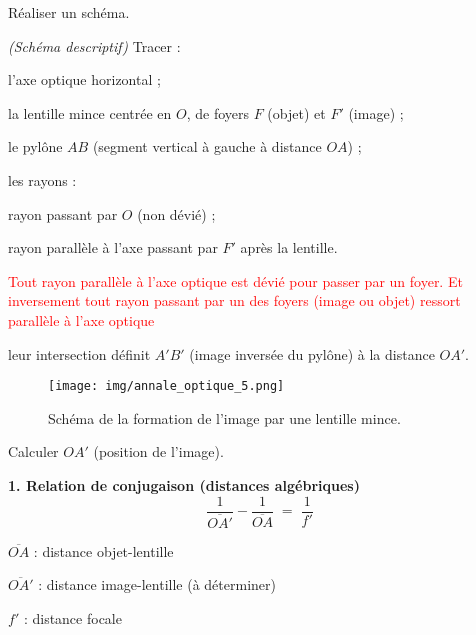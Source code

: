 \documentclass[answers]{exam}
\begin{document}
\begin{questions}
\begin{questions}

\question[C.6.1] Réaliser un schéma.

  \begin{solution}
  \textit{(Schéma descriptif)}  
  Tracer :
  \begin{compactitem}
    \item l’axe optique horizontal ;
    \item la lentille mince centrée en $O$, de foyers $F$ (objet) et $F'$ (image) ;
    \item le pylône $AB$ (segment vertical à gauche à distance $OA$) ;
    \item les rayons :  
      \begin{compactitem}
        \item rayon passant par $O$ (non dévié) ;  
        \item rayon parallèle à l’axe passant par $F'$ après la lentille.  
        \item \textcolor{red}{Tout rayon parallèle à l'axe optique est dévié pour passer par un foyer. Et inversement tout rayon passant par un des foyers (image ou objet) ressort parallèle à l'axe optique}
      \end{compactitem}
    \item leur intersection définit $A'B'$ (image inversée du pylône) à la distance $OA'$.
  \end{compactitem}

  \begin{figure}[H]
  \centering
  \texttt{[image: img/annale\_optique\_5.png]}
  \caption{Schéma de la formation de l'image par une lentille mince.}
  \end{figure}

  \end{solution}



\question[C.6.2] Calculer $OA'$ (position de l’image).
\begin{solution}
\textbf{1. Relation de conjugaison (distances algébriques)}  
\[
  \frac{1}{\overline{OA'}} - \frac{1}{\overline{OA}} \;=\; \frac{1}{f'}
\]

\begin{addmargin}[4em]{1em}
\begin{compactitem}
  \item[\(\overline{OA}\)] : distance objet-lentille  
  \item[\(\overline{OA'}\)] : distance image-lentille (à déterminer)  
  \item[\(f'\)] : distance focale
\end{compactitem}
\end{addmargin}


\end{solution}
\end{questions}
\end{questions}
\end{document}
